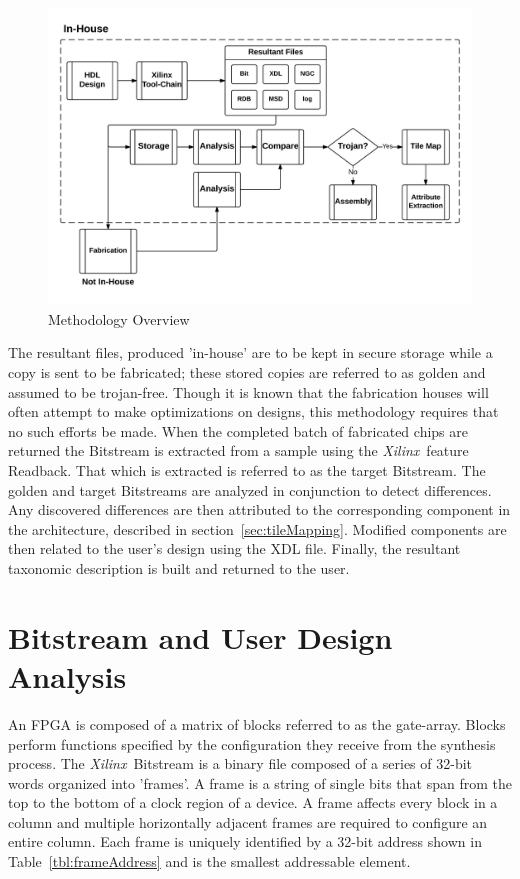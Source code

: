 \documentclass[conference]{IEEEtran}
\newcommand{\Xilinx}{\textit{\gls{Xilinx}}~}
\begin{document}
\begin{figure}
	\centering
	\includegraphics[width=1\linewidth]{../Thesis/Figures/methodologyOverview}
	\caption[Methodology Overview]{Methodology Overview}
	\label{fig:methodologyOverview}
\end{figure}
The resultant files, produced 'in-house' are to be kept in secure storage while a copy is sent to be fabricated; these stored copies are referred to as \gls{golden} and assumed to be trojan-free.
Though it is known that the fabrication houses will often attempt to make optimizations on designs, this methodology requires that no such efforts be made.
When the completed batch of fabricated chips are returned the \gls{Bitstream} is extracted from a sample using the \Xilinx feature \gls{Readback}. 
That which is extracted is referred to as the \gls{target} \gls{Bitstream}.
The \gls{golden} and \gls{target} \gls{Bitstream}s are analyzed in conjunction to detect differences.
Any discovered differences are then attributed to the corresponding component in the architecture, described in section~\ref{sec:tileMapping}.
Modified components are then related to the user's design using the \acrshort{XDL} file.
Finally, the resultant taxonomic description is built and returned to the user.

\section{\gls{Bitstream} and User Design Analysis} \label{sec:fpgaBitStream}
An \acrshort{FPGA} is composed of a matrix of blocks referred to as the gate-array.
Blocks perform functions specified by the configuration they receive from the synthesis process.
The \Xilinx \gls{Bitstream} is a binary file composed of a series of 32-bit words organized into 'frames'.
A frame is a string of single bits that span from the top to the bottom of a clock region of a device.
A frame affects every block in a column and multiple horizontally adjacent frames are required to configure an entire column.
Each frame is uniquely identified by a 32-bit address shown in Table~\ref{tbl:frameAddress} and is the smallest addressable element.
\end{document}
